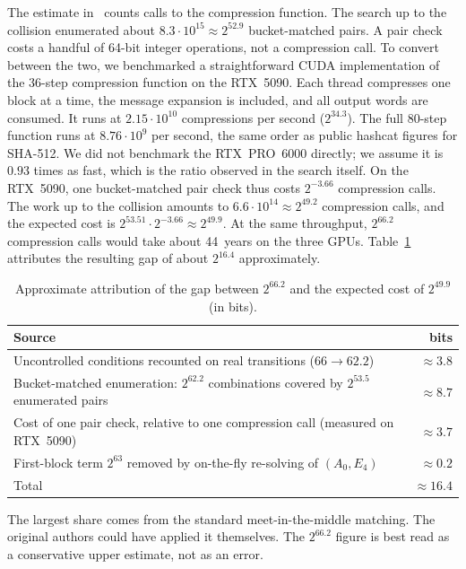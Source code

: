 \documentclass[11pt]{article}
\begin{document}
The estimate in~\cite{LZLLQZ26} counts calls to the compression function. The search up to the collision enumerated about $8.3\cdot 10^{15}\approx 2^{52.9}$ bucket-matched pairs. A pair check costs a handful of 64-bit integer operations, not a compression call. To convert between the two, we benchmarked a straightforward CUDA implementation of the 36-step compression function on the RTX~5090. Each thread compresses one block at a time, the message expansion is included, and all output words are consumed. It runs at $2.15\cdot 10^{10}$ compressions per second ($2^{34.3}$). The full 80-step function runs at $8.76\cdot 10^{9}$ per second, the same order as public hashcat figures for SHA-512. We did not benchmark the RTX~PRO~6000 directly; we assume it is $0.93$ times as fast, which is the ratio observed in the search itself. On the RTX~5090, one bucket-matched pair check thus costs $2^{-3.66}$ compression calls. The work up to the collision amounts to $6.6\cdot 10^{14}\approx 2^{49.2}$ compression calls, and the expected cost is $2^{53.51}\cdot 2^{-3.66}\approx 2^{49.9}$. At the same throughput, $2^{66.2}$ compression calls would take about 44~years on the three GPUs. Table~\ref{tab:gap} attributes the resulting gap of about $2^{16.4}$ approximately.

\begin{table}[h]
\centering
\caption{Approximate attribution of the gap between $2^{66.2}$ and the expected cost of $2^{49.9}$ (in bits).}
\label{tab:gap}
\begin{tabular}{lr}
\toprule
Source & bits \\
\midrule
Uncontrolled conditions recounted on real transitions ($66\to 62.2$) & $\approx 3.8$ \\
Bucket-matched enumeration: $2^{62.2}$ combinations covered by $2^{53.5}$ enumerated pairs & $\approx 8.7$ \\
Cost of one pair check, relative to one compression call (measured on RTX~5090) & $\approx 3.7$ \\
First-block term $2^{63}$ removed by on-the-fly re-solving of $(A_0,E_4)$ & $\approx 0.2$ \\
\midrule
Total & $\approx 16.4$ \\
\bottomrule
\end{tabular}
\end{table}

The largest share comes from the standard meet-in-the-middle matching. The original authors could have applied it themselves. The $2^{66.2}$ figure is best read as a conservative upper estimate, not as an error.
\end{document}
